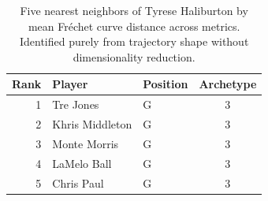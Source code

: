 \begin{table}[htbp]
  \centering\small
  \begin{tabular}{rllc}
    \toprule
    Rank & Player & Position & Archetype \\
    \midrule
    1 & Tre Jones & G & 3 \\
    2 & Khris Middleton & G & 3 \\
    3 & Monte Morris & G & 3 \\
    4 & LaMelo Ball & G & 3 \\
    5 & Chris Paul & G & 3 \\
    \bottomrule
  \end{tabular}
  \caption{Five nearest neighbors of Tyrese Haliburton by mean Fr\'{e}chet curve distance across metrics. Identified purely from trajectory shape without dimensionality reduction.}
  \label{tab:Tyrese_Haliburton_frechet_curve_neighbors}
\end{table}

